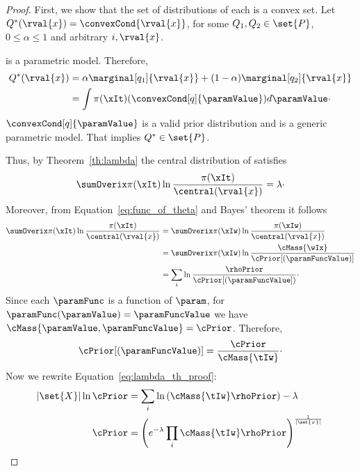\begin{proof}
    First, we show that the set of distributions of each \Qvar is a convex set.
    Let $Q^*(\rval{x}) = \convexCond{\rval{x}}$, for some $Q_1, Q_2 \in \set{P}$, $0 \leq \alpha \leq 1$ and
    arbitrary $i, \rval{x}$.

    \Mt is a parametric model.
    Therefore,
    \begin{align*}
        Q^*(\rval{x}) &= \alpha \marginal[q_1]{\rval{x}} + (1 - \alpha) \marginal[q_2]{\rval{x}}\\
        &= \int \pi(\xIt) (\convexCond[q]{\paramValue}) d\paramValue\cdot
    \end{align*}
    $\convexCond[q]{\paramValue}$ is a valid prior distribution and \Mt is a generic parametric model.
    That implies $Q^* \in \set{P}$.

    Thus, by Theorem~\ref{th:lambda} the central distribution of  satisfies
    \begin{equation}
        \sumOverix \pi(\xIt) \ln \frac{\pi(\xIt)}{\central(\rval{x})} = \lambda\cdot
        \label{eq:lambda_th_proof}
    \end{equation}
    Moreover, from Equation~\ref{eq:func_of_theta} and Bayes' theorem it follows
    \begin{align*}
        \sumOverix \pi(\xIt) \ln \frac{\pi(\xIt)}{\central(\rval{x})}
        &= \sumOverix \pi(\xIw) \ln \frac{\pi(\xIw)}{\central(\rval{x})}\\
        &= \sumOverix \pi(\xIw) \ln \frac{\cMass{\wIx}}{\cPrior[(\paramFuncValue)]}\\
        &= \sum_i \ln \frac{\rhoPrior}{\cPrior[(\paramFuncValue])}\cdot
    \end{align*}
    Since each $\paramFunc$ is a function of $\param$, for $\paramFunc(\paramValue) = \paramFuncValue$
    we have $\cMass{\paramValue, \paramFuncValue}=\cPrior$.
    Therefore,
    \begin{equation*}
        \cPrior[(\paramFuncValue)] = \frac{\cPrior}{\cMass{\tIw}}\cdot
    \end{equation*}
    Now we rewrite Equation~\ref{eq:lambda_th_proof}:
    \begin{align*}
        |\set{X}| \ln \cPrior &= \sum_i \ln \left(\cMass{\tIw} \rhoPrior \right) - \lambda\\
        \cPrior &= \left( e^{-\lambda} \prod_i \cMass{\tIw} \rhoPrior \right)^{\frac{1}{|\set{x}|}} \qedhere
    \end{align*}
\end{proof}



